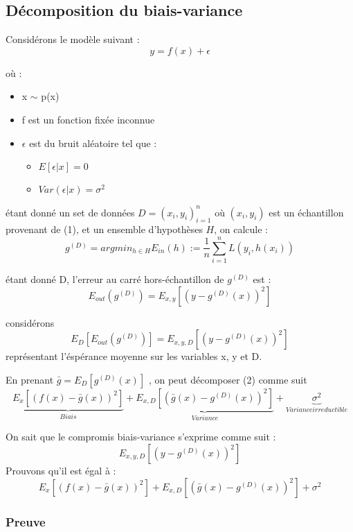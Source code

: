 \documentclass[a4paper]{article}
\begin{document}
\newpage

\subsection{Décomposition du biais-variance}

Considérons le modèle suivant : 
\begin{equation}
y = f(x) + \epsilon
\end{equation}

où : 

\begin{itemize}
	\item x $\sim$ p(x)
	\item f est un fonction fixée inconnue
	\item $\epsilon$ est du bruit aléatoire tel que :
	\begin{itemize}
		\item $E[\epsilon|x] = 0$
		\item $Var(\epsilon|x) = \sigma^2$
	\end{itemize}
\end{itemize}


étant donné un set de données $D = {(x_i, y_i)}^n_{i=1}$ où $(x_i, y_i)$ est un échantillon provenant de (1), et un ensemble d'hypothèses $H$, on calcule :
\[ g^{(D)} = argmin_{h\in H}  E_{in}(h) := \frac{1}{n} \sum_{i=1}^{n} L(y_i,h(x_i)) \]

étant donné D, l'erreur au carré hors-échantillon de $g^{(D)}$ est :
\[ E_{out}(g^{(D)}) = E_{x,y}[(y - g^{(D)}(x))^2] \]

considérons 
\begin{equation}
E_D[E_{out}(g^{(D)})] = E_{x,y,D}[(y - g^{(D)}(x))^2]
\end{equation}
représentant l'éspérance moyenne sur les variables x, y et D.

En prenant $ \bar{g} = E_D[g^{(D)}(x)]$ , on peut décomposer (2) comme suit 
\[ \underbrace{E_x[(f(x) - \bar{g}(x))^2]}_{Biais} + \underbrace{E_{x,D}[(\bar{g}(x) - g^{(D)}(x))^2]}_{Variance} + \underbrace{\sigma^2}_{Variance irreductible} \]

\newpage

On sait que le compromis biais-variance s'exprime comme suit : 
\[ E_{x,y,D}[(y-g^{(D)}(x))^2] \]
Prouvons qu'il est égal à :
\[ E_x[(f(x) - \bar{g}(x))^2] + E_{x,D}[(\bar{g}(x) - g^{(D)}(x))^2] + \sigma^2 \]

\subsubsection{Preuve}
\end{document}
